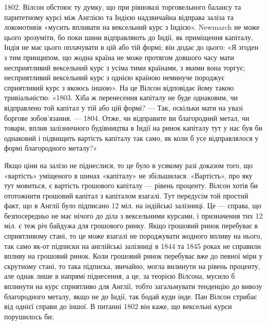 1802. Вілсон обстоює ту думку, що при рівновазі торговельного балансу
та паритетному курсі між Англією та Індією надзвичайна відправа заліза та локомотивів
«мусить впливати на вексельний курс з Індією». Newmarch не може
цього зрозуміти, бо поки шини відправляють до Індії, як приміщення капіталу,
Індія не має цього оплачувати в цій або тій формі; він додає до цього: «Я згоден
з тим принципом, що жодна країна не може протягом довшого часу мати
несприятливий вексельний курс з усіма тими країнами, з якими вона торгує;
несприятливий вексельний курс з однією країною неминуче породжує сприятливий
курс з якоюсь іншою». На це Вілсон відповідає йому такою тривіальністю:
«1803. Хіба ж перенесення капіталу не буде однаковим, чи відправлено той
капітал у тій або цій формі? — Так, оскільки мати на увазі боргове зобов’язання. —
1804. Отже, чи відправите ви благородний метал, чи товари, вплив залізничного
будівництва в Індії на ринок капіталу тут у нас був би однаковий і підвищить
вартість капіталу так само, як коли б усе відправлялося у формі благородного
металу?»

Якщо ціни на залізо не піднеслися, то це було в усякому разі доказом того, що
«вартість» уміщеного в шинах «капіталу» не збільшилася. «Вартість», про яку тут
мовиться, є вартість грошового капіталу — рівень проценту. Вілсон хотів би ототожнити
грошовий капітал з капіталом взагалі. Тут передусім той простий факт, що в
Англії було підписано 12 міл. на індійські залізниці. Це — справа, що безпосередньо
не має нічого до діла з вексельними курсами, і призначення тих 12 міл. є теж річ
байдужа для грошового ринку. Якщо грошовий ринок перебуває в сприятливому
стані, то це може взагалі не породжувати жодного впливу на нього, так само
як-от підписки на англійські залізниці в 1844 та 1845 роках не справили
впливу на грошовий ринок. Коли грошовий ринок перебуває вже до певної міри
у скрутному стані, то така підписка, звичайно, могла вилинути на рівень проценту,
але однак лише в напрямі піднесення, а це, за теорією Вілсона, мусило б вплинути на курс сприятливо
для Англії, тобто загальмувати тенденцію до вивозу благородного металу, якщо не до Індії, так бодай
куди інде. Пан Вілсон стрибає від однієї
справи до іншої. В питанні 1802 він каже, що вексельні курси порушилось би;
\parbreak{}  %
